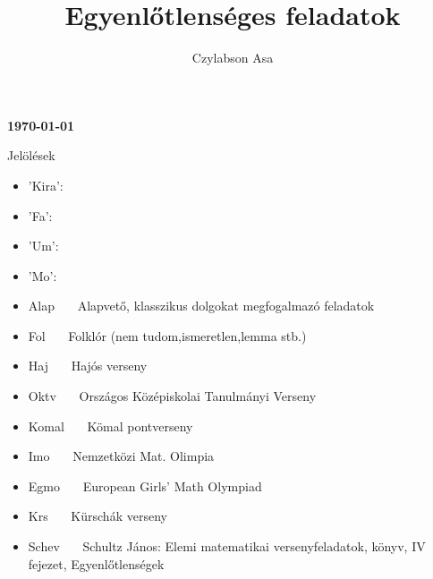 





\begin{spacing}{1.3}


\author{Czylabson Asa}
\title{Egyenlőtlenséges feladatok}
\maketitle

\pagestyle{plain}

\begin{center}{\bf\today}\end{center}
\clearpage
\newpage

\begin{section}{Jelölések}
   \begin{itemize}
		\item 'Kira': 
      \item 'Fa': 
      \item 'Um': 
      \item 'Mo': 
      \newline
      \item Alap {\ \ \ Alapvető, klasszikus dolgokat megfogalmazó feladatok}
      \item Fol {\ \ \ Folklór (nem tudom,ismeretlen,lemma  stb.)}
      \item Haj {\ \ \ Hajós verseny}
      \item Oktv {\ \ \ Országos Középiskolai Tanulmányi Verseny}
      \item Komal {\ \ \ Kömal pontverseny}
      \item Imo {\ \ \ Nemzetközi Mat. Olimpia}
      \item Egmo {\ \ \ European Girls' Math Olympiad}
      \item Krs  {\ \ \ Kürschák verseny }
      \item Schev {\ \ \ Schultz János: Elemi matematikai versenyfeladatok, könyv, IV fejezet, Egyenlőtlenségek}
   \end{itemize}
\end{section}
\newpage


\hspace{2cm}


\end{spacing}
